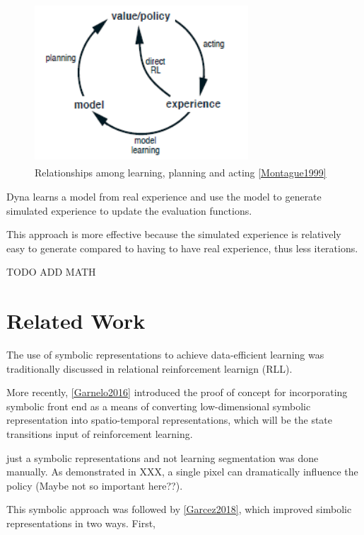 \documentclass[12pt,twoside]{report}
\begin{document}
\begin{figure}[!htb]
\centering
\includegraphics[width=8cm, height=6cm]{./figures/dyna}
\caption{Relationships among learning, planning and acting \ref{Montague1999}}
\label{dyna}
\end{figure}

Dyna learns a model from real experience and use the model to generate simulated experience to update the evaluation functions.

This approach is more effective because the simulated experience is relatively easy to generate compared to having to have real experience, thus less iterations.

TODO ADD MATH

\chapter{Related Work}
\label{related_work}

The use of symbolic representations to achieve data-efficient learning was traditionally discussed in relational reinforcement learnign (RLL).

More recently, \ref{Garnelo2016} introduced the proof of concept for incorporating symbolic front end as a means of converting low-dimensional symbolic representation into spatio-temporal representations, which will be the state transitions input of reinforcement learning.

just a symbolic representations and not learning
segmentation was done manually.
As demonstrated in XXX, a single pixel can dramatically influence the policy (Maybe not so important here??).


This symbolic approach was followed by \ref{Garcez2018}, which improved simbolic representations in two ways. First,
\end{document}
